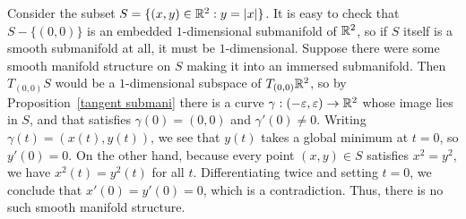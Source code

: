 \begin{example}
Consider the subset $S=\{(x,y)\in\mathbb{R}^2:y=|x|\}$. It is easy to check that $S-\{(0,0)\}$ is an embedded $1$-dimensional submanifold of $\mathbb{R}^2$, so if $S$ itself is a smooth submanifold at all, it must be $1$-dimensional. Suppose there were some smooth manifold structure on $S$ making it into an immersed submanifold. Then $T_{(0,0)}S$ would be a $1$-dimensional subspace of $T_{(0,0)}\mathbb{R}^2$, so by Proposition~\ref{tangent submani} there is a curve $\gamma:(-\varepsilon,\varepsilon)\to\mathbb{R}^2$ whose image lies in $S$, and that satisfies $\gamma(0)=(0,0)$ and $\gamma'(0)\neq0$. Writing $\gamma(t)=(x(t),y(t))$, we see that $y(t)$ takes a global minimum at $t=0$, so $y'(0)=0$. On the other hand, because every point $(x,y)\in S$ satisfies $x^2=y^2$, we have $x^2(t)=y^2(t)$ for all $t$. Differentiating twice and setting $t=0$, we conclude that $x'(0)=y'(0)=0$, which is a contradiction. Thus, there is no such smooth manifold structure.
\end{example}
